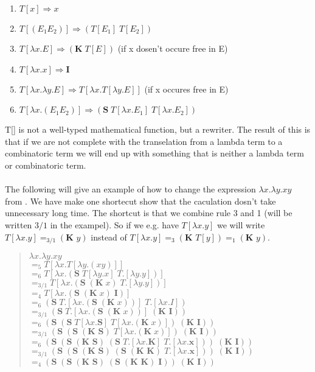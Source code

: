 \begin{enumerate}
    \item $T[x] \Rightarrow x$
    \item $T[(E_1 E_2)] \Rightarrow (T[E_1]\; T[E_2])$
    \item $T[\lambda x.E] \Rightarrow (\textbf{K}\; T[E])$ (if x dosen't occure free in E)
    \item $T[\lambda x.x]\Rightarrow \textbf{I}$
    \item $T[\lambda x. \lambda y.E]\Rightarrow T[\lambda x.T[\lambda y.E]]$ (if x occures free in E)
    \item $T[\lambda x.(E_1 E_2)] \Rightarrow (\textbf{S} \; T[\lambda x.E_1] \; T[\lambda x.E_2])$
\end{enumerate}
T[] is not a well-typed mathematical function, but a rewriter. The result of this is that if we are not complete with
the transelation from a lambda term to a combinatoric term we will end up with something that is neither a lambda term
or combinatoric term. 
\\ \\
The following will give an example of how to change the expression $\lambda x.\lambda y.xy$ from .
We have make one shortecut show that the caculation dosn't take unnecessary long time. The shortcut is that we combine rule 3 and 1 (will be written $3/1$ in the exampel).
So if we e.g. have $T[\lambda x.y]$ we will write $T[\lambda x.y] =_{3/1} (\textbf{K } y)$ instead of $T[\lambda x.y] =_{3} (\textbf{K } T[y]) =_{1} (\textbf{K } y)$.
\begin{quote}
    $\lambda x.\lambda y.xy$ \\
    $=_5 T[\lambda x.T[\lambda y.(xy)]]$ \\
    $=_6 T[\lambda x. (\textbf{S}\; T[\lambda y.x]\; T.[\lambda y.y])]$ \\
    $=_{3/1} T[\lambda x. (\textbf{S}\;(\textbf{K}\; x) \; T.[\lambda y.y])]$ \\  
    $=_4 T[\lambda x. (\textbf{S}\;(\textbf{K}\; x) \; \textbf{I})]$ \\
    $=_6 (\textbf{S} \; T.[\lambda x.(\textbf{S}\;(\textbf{K}\; x))] \; T.[\lambda x.I])$ \\
    $=_{3/1} (\textbf{S} \; T.[\lambda x.(\textbf{S}\;(\textbf{K}\; x))] \; (\textbf{K I}))$ \\
    $=_{6} (\textbf{S} \; (\textbf{S} \; T[\lambda x.\textbf{S}] \; T[\lambda x.(\textbf{K} \; x)]) \; (\textbf{K I}))$ \\
    $=_{3/1} (\textbf{S} \; (\textbf{S} \; (\textbf{K S}) \; T[\lambda x.(\textbf{K} \; x)]) \; (\textbf{K I}))$ \\
    $=_{6} (\textbf{S} \; (\textbf{S} \; (\textbf{K S}) \; (\textbf{S} \; T.[\lambda x.\textbf{K}] \; T.[\lambda x.\textbf{x}]) ) \; (\textbf{K I}))$ \\
    $=_{3/1} (\textbf{S} \; (\textbf{S} \; (\textbf{K S}) \; (\textbf{S} \; (\textbf{K K}) \; T.[\lambda x.\textbf{x}]) ) \; (\textbf{K I}))$ \\
    $=_4 (\textbf{S} \; (\textbf{S} \; (\textbf{K S}) \; (\textbf{S} \; (\textbf{K K}) \; \textbf{I}) ) \; (\textbf{K I}))$ \\      
\end{quote}
